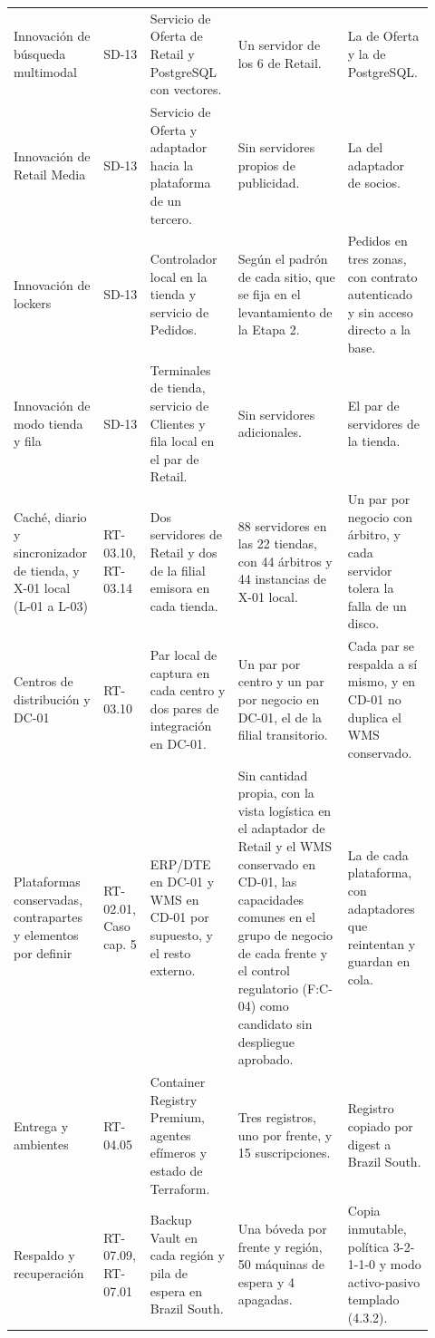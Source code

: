 \documentclass[11pt]{article}
\begin{document}
\begin{longtable}{@{}p{0.20\linewidth}p{0.09\linewidth}p{0.20\linewidth}p{0.25\linewidth}p{0.18\linewidth}@{}}
Innovación de búsqueda multimodal & SD-13 & Servicio de Oferta de Retail y PostgreSQL con vectores. & Un servidor de los 6 de Retail. & La de Oferta y la de PostgreSQL. \\
Innovación de Retail Media & SD-13 & Servicio de Oferta y adaptador hacia la plataforma de un tercero. & Sin servidores propios de publicidad. & La del adaptador de socios. \\
Innovación de lockers & SD-13 & Controlador local en la tienda y servicio de Pedidos. & Según el padrón de cada sitio, que se fija en el levantamiento de la Etapa 2. & Pedidos en tres zonas, con contrato autenticado y sin acceso directo a la base. \\
Innovación de modo tienda y fila & SD-13 & Terminales de tienda, servicio de Clientes y fila local en el par de Retail. & Sin servidores adicionales. & El par de servidores de la tienda. \\
Caché, diario y sincronizador de tienda, y X-01 local (L-01 a L-03) & RT-03.10, RT-03.14 & Dos servidores de Retail y dos de la filial emisora en cada tienda. & 88 servidores en las 22 tiendas, con 44 árbitros y 44 instancias de X-01 local. & Un par por negocio con árbitro, y cada servidor tolera la falla de un disco. \\
Centros de distribución y DC-01 & RT-03.10 & Par local de captura en cada centro y dos pares de integración en DC-01. & Un par por centro y un par por negocio en DC-01, el de la filial transitorio. & Cada par se respalda a sí mismo, y en CD-01 no duplica el WMS conservado. \\
Plataformas conservadas, contrapartes y elementos por definir & RT-02.01, Caso cap. 5 & ERP/DTE en DC-01 y WMS en CD-01 por supuesto, y el resto externo. & Sin cantidad propia, con la vista logística en el adaptador de Retail y el WMS conservado en CD-01, las capacidades comunes en el grupo de negocio de cada frente y el control regulatorio (F:C-04) como candidato sin despliegue aprobado. & La de cada plataforma, con adaptadores que reintentan y guardan en cola. \\
Entrega y ambientes & RT-04.05 & Container Registry Premium, agentes efímeros y estado de Terraform. & Tres registros, uno por frente, y 15 suscripciones. & Registro copiado por digest a Brazil South. \\
Respaldo y recuperación & RT-07.09, RT-07.01 & Backup Vault en cada región y pila de espera en Brazil South. & Una bóveda por frente y región, 50 máquinas de espera y 4 apagadas. & Copia inmutable, política 3-2-1-1-0 y modo activo-pasivo templado (4.3.2). \\
\end{longtable}
\end{document}
